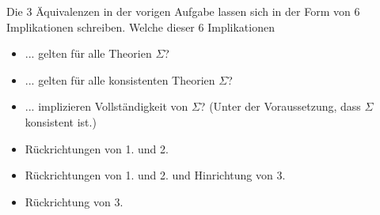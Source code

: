 
\begin{exercise}[114]

Die 3 Äquivalenzen in der vorigen Aufgabe lassen sich in der Form von 6
Implikationen schreiben. Welche dieser 6 Implikationen
\begin{itemize}
  \item ... gelten für alle Theorien $\Sigma$?
  \item ... gelten für alle konsistenten Theorien $\Sigma$?
  \item ... implizieren Vollständigkeit von $\Sigma$? (Unter der Voraussetzung,
  dass $\Sigma$ konsistent ist.)
\end{itemize}
\end{exercise}


\begin{solution}

\phantom{}
\begin{itemize}
  \item Rückrichtungen von 1. und 2.
  \item Rückrichtungen von 1. und 2. und Hinrichtung von 3.
  \item Rückrichtung von 3.
\end{itemize}

\end{solution}

